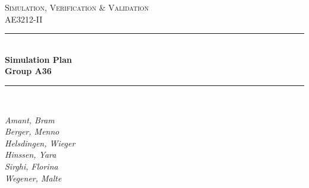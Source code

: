 \begin{titlepage}

\newcommand{\HRule}{\rule{\linewidth}{0.5mm}} %

\center %
 

\textsc{\LARGE Simulation, Verification \& Validation}\\[1cm] %
\textsc{\Large AE3212-II}\\[0.5cm] %


\HRule \\[0.4cm]
{ \huge \bfseries Simulation Plan \\ \vspace{3mm} Group A36}\\[0.4cm] %
\HRule \\[1.5cm]



\begin{minipage}{0.3\textwidth}
\begin{flushleft} \large

\emph{Amant, Bram                 \\
        Berger, Menno               \\
        Helsdingen, Wieger          \\
        Hinssen, Yara               \\
        Sirghi, Florina             \\
Wegener, Malte              \\}
\textsc{} %
\end{flushleft}
\end{minipage}
~
\begin{minipage}{0.3\textwidth}
\begin{flushright} \large


\end{flushright}
\end{minipage}
\end{titlepage}
